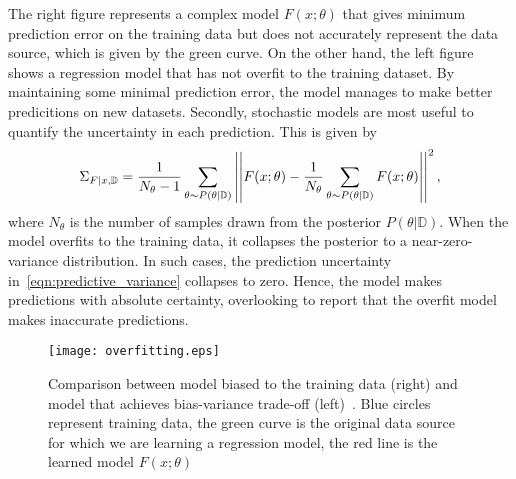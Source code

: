%
The right figure represents a complex model $F(x;\theta)$ that gives minimum
prediction error on the training data but does not accurately represent the data
source, which is given by the green curve.
%
On the other hand, the left figure shows a regression model that has not overfit
to the training dataset.
%
By maintaining some minimal prediction error, the model manages to make better
predicitions on new datasets.
%
Secondly, stochastic models are most useful to quantify the uncertainty in each
prediction. This is given by~\cite{jospin2020hands}
\begin{equation}
  \Sigma_{F \mid x,\mathbb{D}} = \frac{1}{N_{\theta}-1} \sum_{\theta \sim P(\theta | \mathbb{D})} \left|\left|F(x; \theta) - \frac{1}{N_{\theta}} \sum_{\theta \sim P(\theta | \mathbb{D})} F(x; \theta)\right|\right|^2,
  \label{eqn:predictive_variance}
\end{equation}
% 
\noindent where $N_\theta$ is the number of samples drawn from the posterior
$P(\theta | \mathbb{D})$.
%
When the model overfits to the training data, it collapses the
posterior to a near-zero-variance distribution.
%
In such cases, the prediction uncertainty in~\eqref{eqn:predictive_variance}
collapses to zero.
%
Hence, the model makes predictions with absolute certainty, overlooking to report that 
the overfit model makes inaccurate predictions.
%
\begin{figure}
  \centering
  \texttt{[image: overfitting.eps]}
  \caption{Comparison between model biased to the training data (right) and model
  that achieves bias-variance trade-off (left)~\cite{bishop2006pattern}. Blue
  circles represent training data, the green curve is the original data source
  for which we are learning a regression model, the red line is the learned
  model $F(x;\theta)$}
  \label{fig:overfit}
\end{figure}

